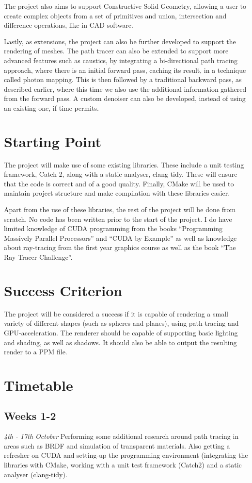 \documentclass[12pt, a4paper]{article}
\newcommand{\newtime}[3]{
    \subsection*{#1}
    \vspace{-\baselineskip}
    \emph{#2}
    \vspace{\baselineskip}
    \newline
    #3
}
\begin{document}
    The project also aims to support Constructive Solid Geometry, allowing a user to create complex objects from a set of primitives and union, intersection and difference operations, like in CAD software.

    Lastly, as extensions, the project can also be further developed to support the rendering of meshes. The path tracer can also be extended to support more advanced features such as caustics, by integrating a bi-directional path tracing approach, where there is an initial forward pass, caching its result, in a technique called photon mapping. This is then followed by a traditional backward pass, as described earlier, where this time we also use the additional information gathered from the forward pass. A custom denoiser can also be developed, instead of using an existing one, if time permits.

    \section*{Starting Point}
    The project will make use of some existing libraries. These include a unit testing framework, Catch 2, along with a static analyser, clang-tidy. These will ensure that the code is correct and of a good quality. Finally, CMake will be used to maintain project structure and make compilation with these libraries easier.

    Apart from the use of these libraries, the rest of the project will be done from scratch. No code has been written prior to the start of the project. I do have limited knowledge of CUDA programming from the books “Programming Massively Parallel Processors” and “CUDA by Example” as well as knowledge about ray-tracing from the first year graphics course as well as the book “The Ray Tracer Challenge”.

    \section*{Success Criterion}
    The project will be considered a success if it is capable of rendering a small variety of different shapes (such as spheres and planes), using path-tracing and GPU-acceleration. The renderer should be capable of supporting basic lighting and shading, as well as shadows. It should also be able to output the resulting render to a PPM file.

    \section*{Timetable}
    \newtime{Weeks 1-2}{4th - 17th October}{Performing some additional research around path tracing in areas such as BRDF and simulation of transparent materials. Also getting a refresher on CUDA and setting-up the programming environment (integrating the libraries with CMake, working with a unit test framework (Catch2) and a static analyser (clang-tidy).}
\end{document}
